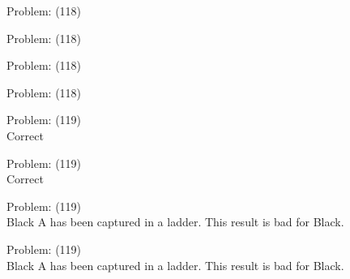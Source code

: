 \documentclass[11pt]{article}
\begin{document}
\begin{minipage}[t]{0.5\textwidth}
  {\centering
  
Problem: (118)\\
  }
\end{minipage}
\begin{minipage}[t]{0.5\textwidth}
  {\centering
  
Problem: (118)\\
  }
\end{minipage}
\begin{minipage}[t]{0.5\textwidth}
  {\centering
  
Problem: (118)\\
  }
\end{minipage}
\begin{minipage}[t]{0.5\textwidth}
  {\centering
  
Problem: (118)\\
  }
\end{minipage}
\begin{minipage}[t]{0.5\textwidth}
  {\centering
  
Problem: (119)\\
Correct\\
  }
\end{minipage}
\begin{minipage}[t]{0.5\textwidth}
  {\centering
  
Problem: (119)\\
Correct\\
  }
\end{minipage}
\begin{minipage}[t]{0.5\textwidth}
  {\centering
  
Problem: (119)\\
Black A has been captured in a ladder. This result is bad for Black.\\
  }
\end{minipage}
\begin{minipage}[t]{0.5\textwidth}
  {\centering
  
Problem: (119)\\
Black A has been captured in a ladder. This result is bad for Black.\\
  }
\end{minipage}
\end{document}
